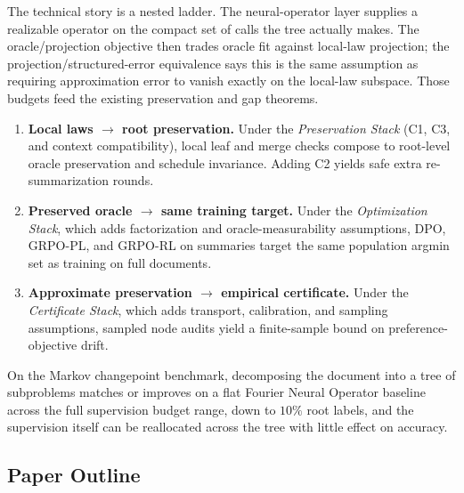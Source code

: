 The technical story is a nested ladder. The neural-operator layer supplies a realizable operator on the compact set of calls the tree actually makes. The oracle/projection objective then trades oracle fit against local-law projection; the projection/structured-error equivalence says this is the same assumption as requiring approximation error to vanish exactly on the local-law subspace. Those budgets feed the existing preservation and gap theorems.
\begin{enumerate}[leftmargin=1.5em]
    \item \textbf{Local laws $\rightarrow$ root preservation.} Under the \emph{Preservation Stack} (C1, C3, and context compatibility), local leaf and merge checks compose to root-level oracle preservation and schedule invariance. Adding C2 yields safe extra re-summarization rounds.
    \item \textbf{Preserved oracle $\rightarrow$ same training target.} Under the \emph{Optimization Stack}, which adds factorization and oracle-measurability assumptions, DPO, GRPO-PL, and GRPO-RL on summaries target the same population argmin set as training on full documents.
    \item \textbf{Approximate preservation $\rightarrow$ empirical certificate.} Under the \emph{Certificate Stack}, which adds transport, calibration, and sampling assumptions, sampled node audits yield a finite-sample bound on preference-objective drift.
\end{enumerate}

On the Markov changepoint benchmark, decomposing the document into a tree of subproblems matches or improves on a flat Fourier Neural Operator baseline across the full supervision budget range, down to $10\%$ root labels, and the supervision itself can be reallocated across the tree with little effect on accuracy.

\subsection{Paper Outline}

